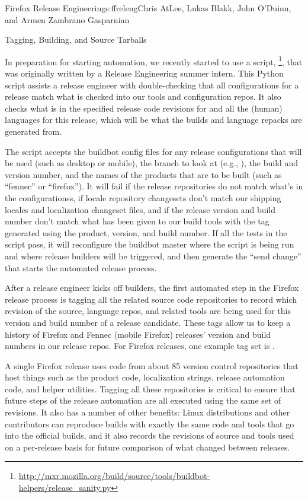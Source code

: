 \begin{aosachapter}{Firefox Release Engineering}{s:ffreleng}{Chris AtLee, Lukas Blakk, John O'Duinn, and Armen Zambrano Gasparnian}
\begin{aosasect1}{Tagging, Building, and Source Tarballs}

    
In preparation for starting automation, we recently started to use a
script,
\footnote{\url{http://mxr.mozilla.org/build/source/tools/buildbot-helpers/release_sanity.py}},
that was originally written by a Release Engineering summer intern. This
Python script assists a release engineer with double-checking that all
configurations for a release match what is checked into our tools and
configuration repos.  It also checks what is in the specified release
code revisions for  and all the (human)
languages for this release, which will be what the builds and language
repacks are generated from.

The script accepts the buildbot config files for any release configurations
that will be used (such as desktop or mobile), the branch to look at (e.g.,
), the build and version number, and the names of the
products that are to be built (such as ``fennec'' or ``firefox''). It will fail if
the release repositories do not
match what's in the configurationss, if locale repository changesets don't
match our shipping locales and localization changeset files, and if the
release version and build number don't match what has been given to
our build tools with the tag generated using the product,
version, and build number. If all
the tests in the script pass, it will reconfigure the
buildbot master where the script is being run and where release
builders will be triggered, and then generate the ``send change'' that
starts the automated release process.

After a release engineer kicks off builders,
the first automated step in the Firefox release process is tagging all
the related source code repositories to record which revision of
the source, language repos, and related tools are being used for this
version and build number of a release candidate. 
These tags allow us
to keep a history of Firefox and Fennec (mobile Firefox) releases'
version and build numbers in our release repos.
For Firefox releases, one example tag set is
.  

A single Firefox
release uses code from about 85 version control repositories that host
things such as the product code, localization strings, release
automation code, and helper utilities. Tagging all these repositories
is critical to ensure that future steps of the release
automation are all executed using the same set of revisions. It also has a
number of other benefits: Linux distributions and other contributors
can reproduce builds with exactly the same code and tools that go into the
official builds, and it also records the revisions of source and tools
used on a per-release basis for future comparison of what changed
between releases. 
    

\end{aosasect1}
\end{aosachapter}
